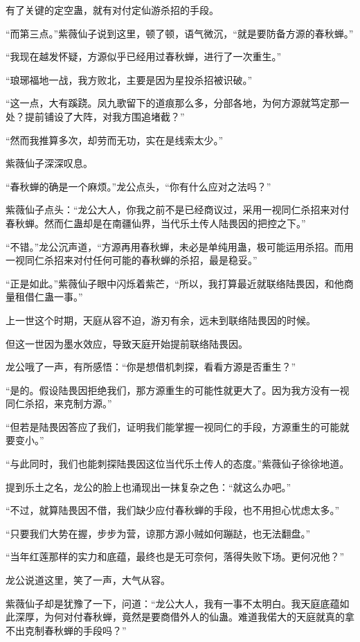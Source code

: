 \begin{this_body}
有了关键的定空蛊，就有对付定仙游杀招的手段。

“而第三点。”紫薇仙子说到这里，顿了顿，语气微沉，“就是要防备方源的春秋蝉。”

“我现在越发怀疑，方源似乎已经用过春秋蝉，进行了一次重生。”

“琅琊福地一战，我方败北，主要是因为星投杀招被识破。”

“这一点，大有蹊跷。凤九歌留下的道痕那么多，分部各地，为何方源就笃定那一处？提前铺设了大阵，对我方围追堵截？”

“然而我推算多次，却劳而无功，实在是线索太少。”

紫薇仙子深深叹息。

“春秋蝉的确是一个麻烦。”龙公点头，“你有什么应对之法吗？”

紫薇仙子点头：“龙公大人，你我之前不是已经商议过，采用一视同仁杀招来对付春秋蝉。然而仁蛊却是在南疆仙界，当代乐土传人陆畏因的把控之下。”

“不错。”龙公沉声道，“方源再用春秋蝉，未必是单纯用蛊，极可能运用杀招。而用一视同仁杀招来对付任何可能的春秋蝉的杀招，最是稳妥。”

“正是如此。”紫薇仙子眼中闪烁着紫芒，“所以，我打算最近就联络陆畏因，和他商量租借仁蛊一事。”

上一世这个时期，天庭从容不迫，游刃有余，远未到联络陆畏因的时候。

但这一世因为墨水效应，导致天庭开始提前联络陆畏因。

龙公哦了一声，有所感悟：“你是想借机刺探，看看方源是否重生？”

“是的。假设陆畏因拒绝我们，那方源重生的可能性就更大了。因为我方没有一视同仁杀招，来克制方源。”

“但若是陆畏因答应了我们，证明我们能掌握一视同仁的手段，方源重生的可能就要变小。”

“与此同时，我们也能刺探陆畏因这位当代乐土传人的态度。”紫薇仙子徐徐地道。

提到乐土之名，龙公的脸上也涌现出一抹复杂之色：“就这么办吧。”

“不过，就算陆畏因不借，我们缺少应付春秋蝉的手段，也不用担心忧虑太多。”

“只要我们大势在握，步步为营，谅那方源小贼如何蹦跶，也无法翻盘。”

“当年红莲那样的实力和底蕴，最终也是无可奈何，落得失败下场。更何况他？”

龙公说道这里，笑了一声，大气从容。

紫薇仙子却是犹豫了一下，问道：“龙公大人，我有一事不太明白。我天庭底蕴如此深厚，为何对付春秋蝉，竟然是要商借外人的仙蛊。难道我偌大的天庭就真的拿不出克制春秋蝉的手段吗？”


\end{this_body}
